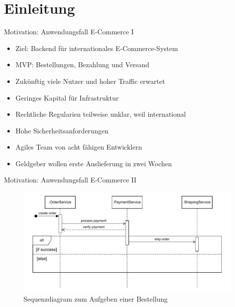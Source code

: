 \section*{Einleitung}

\begin{frame}{Motivation: Anwendungsfall E-Commerce I}
    \begin{itemize}
        \item Ziel: Backend für internationales E-Commerce-System
        \item MVP: Bestellungen, Bezahlung und Versand
        \item Zukünftig viele Nutzer und hoher Traffic erwartet
        \item Geringes Kapital für Infrastruktur
        \item Rechtliche Regularien teilweise unklar, weil international
        \item Hohe Sicherheitsanforderungen
        \item Agiles Team von acht fähigen Entwicklern
        \item Geldgeber wollen erste Auslieferung in zwei Wochen
    \end{itemize}
\end{frame}

\begin{frame}{Motivation: Anwendungsfall E-Commerce II}
    \begin{figure}[!h]
        \centering
        \includegraphics[scale=0.65]{imglib/einleitung/ecommerce.drawio}
        \caption{Sequenzdiagram zum Aufgeben einer Bestellung}
        \label{fig:ecommerce}
    \end{figure}
\end{frame}
